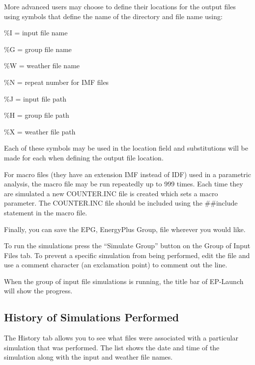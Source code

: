 More advanced users may choose to define their locations for the output files using symbols that define the name of the directory and file name using:

\%I = input file name

\%G = group file name

\%W = weather file name

\%N = repeat number for IMF files

\%J = input file path

\%H = group file path

\%X = weather file path

Each of these symbols may be used in the location field and substitutions will be made for each when defining the output file location.

For macro files (they have an extension IMF instead of IDF) used in a parametric analysis, the macro file may be run repeatedly up to 999 times. Each time they are simulated a new COUNTER.INC file is created which sets a macro parameter. The COUNTER.INC file should be included using the \#\#include statement in the macro file.

Finally, you can save the EPG, EnergyPlus Group, file wherever you would like.

To run the simulations press the ``Simulate Group'' button on the Group of Input Files tab. To prevent a specific simulation from being performed, edit the file and use a comment character (an exclamation point) to comment out the line.

When the group of input file simulations is running, the title bar of EP-Launch will show the progress.

\subsection{History of Simulations Performed}\label{history-of-simulations-performed}

The History tab allows you to see what files were associated with a particular simulation that was performed. The list shows the date and time of the simulation along with the input and weather file names.


